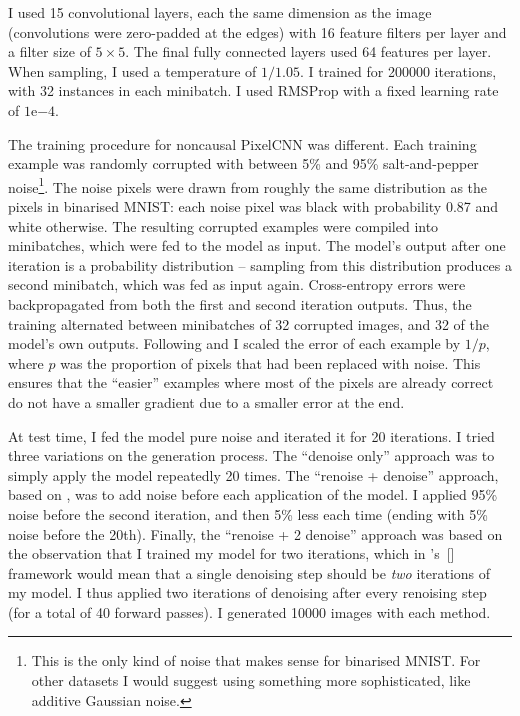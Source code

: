 \documentclass[11pt, a4paper, openany]{book}
\newcommand{\nquote}[1]{``{#1}''}
\newcommand\cites[1]{\citeauthor{#1}'s\ [\citeyear{#1}]}
\begin{document}
I used 15 convolutional layers, each the same dimension as the image (convolutions were zero-padded at the edges) with 16 feature filters per layer and a filter size of $5\times 5$. The final fully connected layers used 64 features per layer. When sampling, I used a temperature of $1/1.05$. I trained for 200000 iterations, with 32 instances in each minibatch. I used RMSProp with a fixed learning rate of $1\mathrm{e}{-4}$.

The training procedure for noncausal PixelCNN was different. Each training example was randomly corrupted with between 5\% and 95\% salt-and-pepper noise\footnote{This is the only kind of noise that makes sense for binarised MNIST. For other datasets I would suggest using something more sophisticated, like additive Gaussian noise.}. The noise pixels were drawn from roughly the same distribution as the pixels in binarised MNIST: each noise pixel was black with probability 0.87 and white otherwise. The resulting corrupted examples were compiled into minibatches, which were fed to the model as input. The model's output after one iteration is a probability distribution -- sampling from this distribution produces a second minibatch, which was fed as input again. Cross-entropy errors were backpropagated from both the first and second iteration outputs. Thus, the training alternated between minibatches of 32 corrupted images, and 32 of the model's own outputs. Following \citet{dnade} and \citet{infusion} I scaled the error of each example by $1/p$, where $p$ was the proportion of pixels that had been replaced with noise. This ensures that the \nquote{easier} examples where most of the pixels are already correct do not have a smaller gradient due to a smaller error at the end.

At test time, I fed the model pure noise and iterated it for 20 iterations. I tried three variations on the generation process. The \nquote{denoise only} approach was to simply apply the model repeatedly 20 times. The \nquote{renoise + denoise} approach, based on \citet{gsnnade}, was to add noise before each application of the model. I applied 95\% noise before the second iteration, and then 5\% less each time (ending with 5\% noise before the 20th). Finally, the \nquote{renoise + 2 denoise} approach was based on the observation that I trained my model for two iterations, which in \cites{gsnnade} framework would mean that a single denoising step should be \emph{two} iterations of my model. I thus applied two iterations of denoising after every renoising step (for a total of 40 forward passes). I generated 10000 images with each method.
\end{document}
